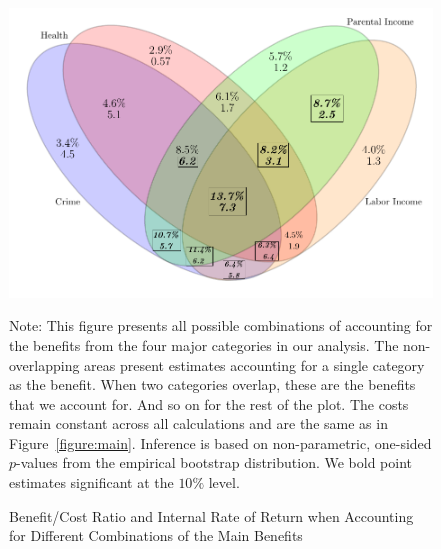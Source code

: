 \documentclass[static]{JJH-Beamer}
\begin{document}
\clearpage


\begin{figure}[H]
\caption{Benefit/Cost Ratio and Internal Rate of Return when Accounting for Different Combinations of the Main Benefits}\label{figure:vennpooled}
\begin{center}
\includegraphics[width=.7\columnwidth]{output/venn_pooled.pdf}
\end{center}
\flushleft\tiny
Note: This figure presents all possible combinations of accounting for the benefits from the four major categories in our analysis. The non-overlapping areas present estimates accounting for a single category as the benefit. When two categories overlap, these are the benefits that we account for. And so on for the rest of the plot. The costs remain constant across all calculations and are the same as in Figure~\ref{figure:main}. Inference is based on non-parametric, one-sided $p$-values from the empirical bootstrap distribution. We bold point estimates significant at the $10\%$ level.\\
\end{figure}

\clearpage
\end{document}
